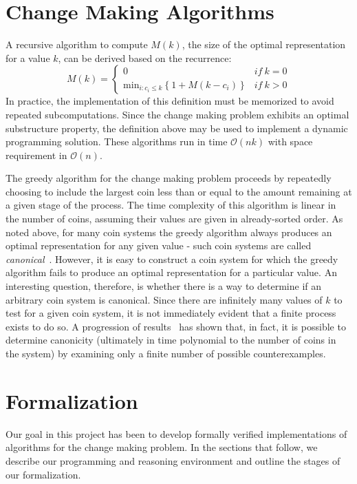 \documentclass{acm_proc_article-sp}
\begin{document}
\section{Change Making Algorithms}

A recursive algorithm to compute $M(k)$, the size of the optimal representation for a value $k$, can be derived based on the recurrence:
\[
M(k) = \left\{ 
	\begin{array}{lr}
	0 & \textit{if}~k=0\\
	\textrm{min}_{i:c_i \le k}\left\{1 + M(k - c_i)\right\}   & \textit{if}~k>0
	\end{array}\right.
\]
In practice, the implementation of this definition must be memorized to avoid repeated subcomputations. Since the change making problem exhibits an optimal substructure property, the definition above may be used to implement a dynamic programming solution. These algorithms run in time $\mathcal{O}(nk)$ with space requirement in $\mathcal{O}(n)$. 


The greedy algorithm for the change making problem proceeds by repeatedly choosing to include the largest coin less than or equal to the amount remaining at a given stage of the process. The time complexity of this algorithm is linear in the number of coins, assuming their values are given in already-sorted order.  As noted above, for many coin systems the greedy algorithm always produces an optimal representation for any given value - such coin systems are called \emph{canonical}~\cite{martello90}. However, it is easy to construct a coin system for which the greedy algorithm fails to produce an optimal representation for a particular value. An interesting question, therefore, is whether there is a way to determine if an arbitrary coin system is canonical. Since there are infinitely many values of $k$ to test for a given coin system, it is not immediately evident that a finite process exists to do so. A progression of results~\cite{chang70,kozen94,pearson94} has shown that, in fact, it is possible to determine canonicity (ultimately in time polynomial to the number of coins in the system) by examining only a finite number of possible counterexamples. 


\section{Formalization}

Our goal in this project has been to develop formally verified implementations of algorithms for the change making problem. In the sections that follow, we describe our programming and reasoning environment and outline the stages of our formalization. 
\end{document}
